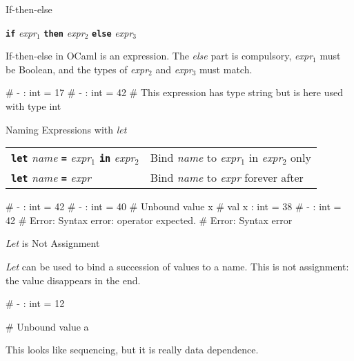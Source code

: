 \documentclass{plt}
\begin{document}
\begin{frame}[fragile]{If-then-else}

  \begin{center}
  \textbf{\texttt{if}} \emph{expr}$_1$ \textbf{\texttt{then}}
  \emph{expr}$_2$ \textbf{\texttt{else}} \emph{expr}$_3$
  \end{center}

  If-then-else in OCaml is an expression.  The \emph{else} part is
  compulsory, \emph{expr}$_1$ must be Boolean, and the types of
  \emph{expr}$_2$ and \emph{expr}$_3$ must match.

\begin{interactive}
# 
- : int = 17
\li
# 
- : int = 42
\li
# 
This expression has type string but is here used with type int
\end{interactive}

\end{frame}

\begin{frame}[fragile]{Naming Expressions with \emph{let}}

  \begin{tabular}{ll}
    \textbf{\texttt{let}} \emph{name} \textbf{\texttt{=}}
    \emph{expr}$_1$ \texttt{\textbf{in}} \emph{expr}$_2$ &
  Bind \emph{name} to \emph{expr}$_1$ in \emph{expr}$_2$ only
  \\
  \textbf{\texttt{let}} \emph{name} \textbf{\texttt{=}} \emph{expr} &
  Bind \emph{name} to \emph{expr} forever after  

  \end{tabular}
  
\begin{interactive}
# 
  - : int = 42
\li
# 
- : int = 40
\li
# 
Unbound value x
\li
# 
val x : int = 38
\li
# 
- : int = 42
\li
# 
Error: Syntax error: operator expected.
\li
# 
Error: Syntax error
\end{interactive}

\end{frame}

\begin{frame}[fragile]{\emph{Let} is Not Assignment}

\emph{Let} can be used to bind a succession of values to a name.
This is not assignment: the value disappears in the end.

\begin{interactive}
# 
- : int = 12

# 
Unbound value a
\end{interactive}

This looks like sequencing, but it is really data dependence.

\end{frame}
\end{document}
